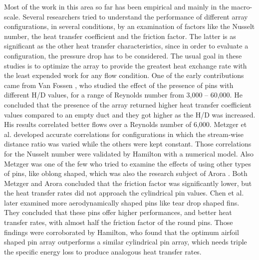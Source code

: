                            Most of the work in this area so far has been empirical and mainly in the macro-scale. Several researchers tried to understand the performance of
                           different array configurations, in several conditions, by an examination of factors
                           like the Nusselt number, the heat transfer coefficient and the friction factor. The
                           latter is as significant as the other heat transfer characteristics, since in order to
                           evaluate a configuration, the pressure drop has to be considered. The usual goal
                           in these studies is to optimize the array to provide the greatest heat exchange
                           rate with the least expended work for any flow condition.
                           One of the early contributions came from Van Fossen , who
                           studied the effect of the presence of pins with different H/D values, for a range of
                           Reynolds number from 3,000 – 60,000. He concluded that the presence of the
                           array returned higher heat transfer coefficient values compared to an empty duct
                           and they got higher as the H/D was increased. His results correlated better flows
                           over a Reynolds number of 6,000.
                           Metzger et al.  developed accurate correlations for
                           configurations in which the stream-wise distance ratio was varied while the
                           others were kept constant. Those correlations for the Nusselt number were
                           validated by Hamilton  with a numerical model. Also Metzger was one of
                           the few who tried to examine the effects of using other types of pins, like oblong
                           shaped, which was also the research subject of Arora . Both Metzger and
                           Arora concluded that the friction factor was significantly lower, but the heat
                           transfer rates did not approach the cylindrical pin values.
                           Chen et al.  later examined more aerodynamically shaped pins like
                           tear drop shaped fins. They concluded that these pins offer higher performances,
                           and better heat transfer rates, with almost half the friction factor of the round
                           pins. Those findings were corroborated by Hamilton, who found that the optimum
                           airfoil shaped pin array outperforms a similar cylindrical pin array, which needs
                           triple the specific energy loss to produce analogous heat transfer rates.
                           
